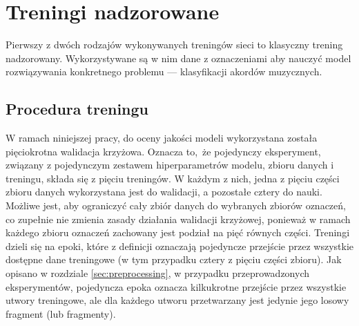 \section{Treningi nadzorowane}

Pierwszy z dwóch rodzajów wykonywanych treningów sieci to klasyczny trening nadzorowany.
Wykorzystywane są w nim dane z oznaczeniami aby nauczyć model rozwiązywania konkretnego problemu ---
klasyfikacji akordów muzycznych. 


\subsection{Procedura treningu}

W ramach niniejszej pracy, do oceny jakości modeli wykorzystana została pięciokrotna walidacja
krzyżowa. Oznacza to, że pojedynczy eksperyment, związany z pojedynczym zestawem hiperparametrów
modelu, zbioru danych i treningu, składa się z pięciu treningów. W każdym z nich, jedna z pięciu
części zbioru danych wykorzystana jest do walidacji, a pozostałe cztery do nauki. Możliwe jest, aby
ograniczyć cały zbiór danych do wybranych zbiorów oznaczeń, co zupełnie nie zmienia zasady działania
walidacji krzyżowej, ponieważ w ramach każdego zbioru oznaczeń zachowany jest podział na pięć
równych części. Treningi dzieli się na epoki, które z definicji oznaczają pojedyncze przejście przez
wszystkie dostępne dane treningowe (w tym przypadku cztery z pięciu części zbioru). Jak opisano w
rozdziale \ref{sec:preprocessing}, w przypadku przeprowadzonych eksperymentów, pojedyncza epoka
oznacza kilkukrotne przejście przez wszystkie utwory treningowe, ale dla każdego utworu przetwarzany
jest jedynie jego losowy fragment (lub fragmenty).

